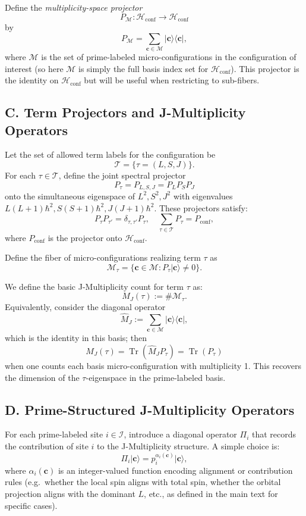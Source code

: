 \documentclass[11pt]{article}
\begin{document}
Define the \emph{multiplicity-space projector}
\[
P_{\mathcal{M}} : \mathcal{H}_{\text{conf}} \to \mathcal{H}_{\text{conf}}
\]
by
\[
P_{\mathcal{M}} = \sum_{\mathbf{c}\in \mathcal{M}} \lvert \mathbf{c} \rangle \langle \mathbf{c} \rvert,
\]
where \(\mathcal{M}\) is the set of prime-labeled micro-configurations in the configuration of interest (so here \(\mathcal{M}\) is simply the full basis index set for \(\mathcal{H}_{\text{conf}}\)). This projector is the identity on \(\mathcal{H}_{\text{conf}}\) but will be useful when restricting to sub-fibers.

\subsection*{C. Term Projectors and J-Multiplicity Operators}

Let the set of allowed term labels for the configuration be
\[
\mathcal{T} = \{ \tau = (L,S,J) \}.
\]
For each \(\tau \in \mathcal{T}\), define the joint spectral projector
\[
P_\tau = P_{L,S,J} = P_{L} P_{S} P_{J}
\]
onto the simultaneous eigenspace of \(L^2, S^2, J^2\) with eigenvalues \(L(L+1)\hbar^2, S(S+1)\hbar^2, J(J+1)\hbar^2\). These projectors satisfy:
\[
P_\tau P_{\tau'} = \delta_{\tau,\tau'} P_\tau, \quad \sum_{\tau\in\mathcal{T}} P_\tau = P_{\text{conf}},
\]
where \(P_{\text{conf}}\) is the projector onto \(\mathcal{H}_{\text{conf}}\).

Define the fiber of micro-configurations realizing term \(\tau\) as
\[
\mathcal{M}_\tau = \{ \mathbf{c} \in \mathcal{M} : P_\tau \lvert \mathbf{c} \rangle \neq 0 \}.
\]

We define the basic J-Multiplicity count for term \(\tau\) as:
\[
M_J(\tau) := \# \mathcal{M}_\tau.
\]
Equivalently, consider the diagonal operator
\[
\widehat{M}_J := \sum_{\mathbf{c} \in \mathcal{M}} \lvert \mathbf{c} \rangle \langle \mathbf{c} \rvert,
\]
which is the identity in this basis; then
\[
M_J(\tau) = \operatorname{Tr}\left( \widehat{M}_J P_\tau \right) = \operatorname{Tr}\left( P_\tau \right)
\]
when one counts each basis micro-configuration with multiplicity 1. This recovers the dimension of the \(\tau\)-eigenspace in the prime-labeled basis.

\subsection*{D. Prime-Structured J-Multiplicity Operators}

For each prime-labeled site \(i\in\mathcal{I}\), introduce a diagonal operator \(\Pi_i\) that records the contribution of site \(i\) to the J-Multiplicity structure. A simple choice is:
\[
\Pi_i \lvert \mathbf{c} \rangle = p_i^{\alpha_i(\mathbf{c})} \lvert \mathbf{c} \rangle,
\]
where \(\alpha_i(\mathbf{c})\) is an integer-valued function encoding alignment or contribution rules (e.g.\ whether the local spin aligns with total spin, whether the orbital projection aligns with the dominant \(L\), etc., as defined in the main text for specific cases).
\end{document}
